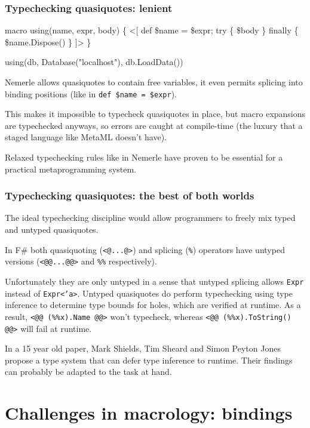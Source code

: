 \documentclass[hyperref={bookmarks=false}]{beamer}
\begin{document}
\begin{frame}[fragile]
\frametitle{Typechecking quasiquotes: lenient}

\begin{lstlistinglike}
\begin{semiverbatim}
macro using(name, expr, body) \{
  <[
    def \$name = \$expr;
    try \{ \$body \} finally \{ \$name.Dispose() \}
  ]>
\}

using(db, Database("localhost"), db.LoadData())
\end{semiverbatim}
\end{lstlistinglike}

Nemerle allows quasiquotes to contain free variables, it even permits
splicing into binding positions (like in \texttt{def \$name = \$expr}).

This makes it impossible to typecheck quasiquotes in place,
but macro expansions are typechecked anyways,
so errors are caught at compile-time
(the luxury that a staged language like MetaML doesn't have).

Relaxed typechecking rules like in Nemerle have proven to be essential
for a practical metaprogramming system.
\end{frame}

\begin{frame}[fragile]
\frametitle{Typechecking quasiquotes: the best of both worlds}

The ideal typechecking discipline would allow programmers to freely mix
typed and untyped quasiquotes.

In F\# both quasiquoting (\texttt{<@...@>}) and splicing (\texttt{\%}) operators
have untyped versions (\texttt{<@@...@@>} and \texttt{\%\%} respectively).

Unfortunately they are only untyped in a sense that untyped splicing
allows \texttt{Expr} instead of \texttt{Expr<'a>}. Untyped quasiquotes do perform typechecking
using type inference to determine type bounds for holes, which are verified at runtime.
As a result, \texttt{<@@ (\%\%x).Name @@>} won't typecheck, whereas \texttt{<@@ (\%\%x).ToString() @@>}
will fail at runtime.

In a 15 year old paper, Mark Shields, Tim Sheard and Simon Peyton Jones propose a type system
that can defer type inference to runtime. Their findings can probably be adapted to the task at hand.
\end{frame}

\section{Challenges in macrology: bindings}
\end{document}
